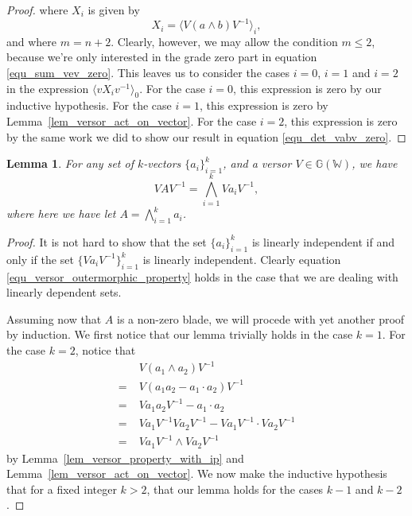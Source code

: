\documentclass{birkjour}
\newtheorem{lem}[thm]{Lemma}
\theoremstyle{definition}
\theoremstyle{remark}
\numberwithin{equation}{section}
\newcommand{\G}{\mathbb{G}}
\newcommand{\W}{\mathbb{W}}
\begin{document}
\begin{proof}
where $X_i$ is given by
\begin{equation}
X_i = \langle V(a\wedge b)V^{-1}\rangle_i,
\end{equation}
and where $m=n+2$.  Clearly, however, we may allow the condition $m\leq 2$, because
we're only interested in the grade zero part in equation \eqref{equ_sum_vev_zero}.  This leaves us to
consider the cases $i=0$, $i=1$ and $i=2$ in the expression $\langle vX_iv^{-1}\rangle_0$.
For the case $i=0$, this expression is zero by our inductive hypothesis.
For the case $i=1$, this expression is zero by Lemma~\ref{lem_versor_act_on_vector}.  For the case $i=2$, this
expression is zero by the same work we did to show our result in equation \eqref{equ_det_vabv_zero}.
\end{proof}

\begin{lem}\label{lem_versor_outermorphic_property}
For any set of $k$-vectors $\{a_i\}_{i=1}^k$, and a versor $V\in\G(\W)$,
we have
\begin{equation}\label{equ_versor_outermorphic_property}
VAV^{-1} = \bigwedge_{i=1}^k Va_iV^{-1},
\end{equation}
where here we have let $A=\bigwedge_{i=1}^k a_i$.
\end{lem}
\begin{proof}
It is not hard to show that the set $\{a_i\}_{i=1}^k$ is linearly
independent if and only if the set $\{Va_iV^{-1}\}_{i=1}^k$ is
linearly independent.  Clearly equation \eqref{equ_versor_outermorphic_property} holds in the
case that we are dealing with linearly dependent sets.

Assuming now that $A$ is a non-zero blade, we will procede with yet
another proof by induction.  We first notice that our lemma trivially holds in the case $k=1$.
For the case $k=2$, notice that
\begin{align}
 & V(a_1\wedge a_2)V^{-1} \\
 =\;& V(a_1a_2-a_1\cdot a_2)V^{-1} \\
 =\;& Va_1a_2V^{-1}-a_1\cdot a_2 \\
 =\;& Va_1V^{-1}Va_2V^{-1}-Va_1V^{-1}\cdot Va_2V^{-1} \\
 =\;& Va_1V^{-1}\wedge Va_2V^{-1}
\end{align}
by Lemma~\ref{lem_versor_property_with_ip} and Lemma~\ref{lem_versor_act_on_vector}.
We now make the inductive hypothesis that for a fixed integer $k>2$, that our
lemma holds for the cases $k-1$ and $k-2$.


\end{proof}
\end{document}
